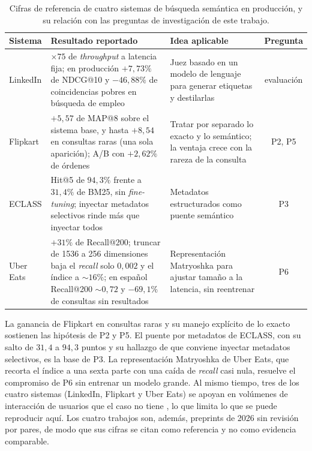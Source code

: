 \documentclass[11pt,letterpaper]{article}
\numberwithin{equation}{section}
\begin{document}
\begin{table}[htbp]
\centering
\footnotesize
\setlength{\tabcolsep}{5pt}
\renewcommand{\arraystretch}{1.25}
\caption{Cifras de referencia de cuatro sistemas de búsqueda semántica en producción, y su relación con las preguntas de investigación de este trabajo.}
\label{tab:produccion}
\begin{tabularx}{\textwidth}{@{}l Y Y c@{}}
\toprule
\textbf{Sistema} & \textbf{Resultado reportado} & \textbf{Idea aplicable} & \textbf{Pregunta} \\
\midrule
LinkedIn \cite{borisyuk2026linkedin} &
$\times 75$ de \textit{throughput} a latencia fija; en producción $+7{,}73\%$ de NDCG@10 y $-46{,}88\%$ de coincidencias pobres en búsqueda de empleo &
Juez basado en un modelo de lenguaje para generar etiquetas y destilarlas &
evaluación \\
Flipkart \cite{kothari2026flipkart} &
$+5{,}57$ de MAP@8 sobre el sistema base, y hasta $+8{,}54$ en consultas raras (una sola aparición); A/B con $+2{,}62\%$ de órdenes &
Tratar por separado lo exacto y lo semántico; la ventaja crece con la rareza de la consulta &
P2, P5 \\
ECLASS \cite{baumgart2026eclass} &
Hit@5 de $94{,}3\%$ frente a $31{,}4\%$ de BM25, sin \textit{fine-tuning}; inyectar metadatos selectivos rinde más que inyectar todos &
Metadatos estructurados como puente semántico &
P3 \\
Uber Eats \cite{ling2026ubereats} &
$+31\%$ de Recall@200; truncar de 1536 a 256 dimensiones baja el \textit{recall} solo $0{,}002$ y el índice a ${\sim}16\%$; en español Recall@200 ${\sim}0{,}72$ y $-69{,}1\%$ de consultas sin resultados &
Representación Matryoshka para ajustar tamaño a la latencia, sin reentrenar &
P6 \\
\bottomrule
\end{tabularx}
\end{table}

La ganancia de Flipkart en consultas raras y su manejo explícito de lo exacto sostienen las hipótesis de P2 y P5. El puente por metadatos de ECLASS, con su salto de $31{,}4$ a $94{,}3$ puntos y su hallazgo de que conviene inyectar metadatos selectivos, es la base de P3. La representación Matryoshka de Uber Eats, que recorta el índice a una sexta parte con una caída de \textit{recall} casi nula, resuelve el compromiso de P6 sin entrenar un modelo grande. Al mismo tiempo, tres de los cuatro sistemas (LinkedIn, Flipkart y Uber Eats) se apoyan en volúmenes de interacción de usuarios que el caso no tiene \cite{ling2026ubereats,borisyuk2026linkedin,kothari2026flipkart}, lo que limita lo que se puede reproducir aquí. Los cuatro trabajos son, además, preprints de 2026 sin revisión por pares, de modo que sus cifras se citan como referencia y no como evidencia comparable.
\end{document}
